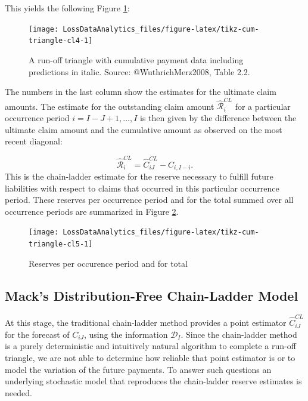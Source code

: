 \documentclass[]{book}
\begin{document}
This yields the following Figure \ref{fig:tikz-cum-triangle-cl4}:

\begin{figure}

{\centering \texttt{[image: LossDataAnalytics\_files/figure-latex/tikz-cum-triangle-cl4-1]} 

}

\caption{A run-off triangle with cumulative payment data including predictions in italic. Source: @WuthrichMerz2008, Table 2.2.}\label{fig:tikz-cum-triangle-cl4}
\end{figure}

The numbers in the last column show the estimates for the ultimate claim
amounts. The estimate for the outstanding claim amount
\(\hat{\mathcal{R}}_i^{CL}\) for a particular occurrence period
\(i=I-J+1,\ldots, I\) is then given by the difference between the
ultimate claim amount and the cumulative amount as observed on the most
recent diagonal:

\[
\hat{\mathcal{R}}_i^{CL} =\hat{C}_{iJ}^{CL}-C_{i,I-i}.
\] This is the chain-ladder estimate for the reserve necessary to
fulfill future liabilities with respect to claims that occurred in this
particular occurrence period. These reserves per occurrence period and
for the total summed over all occurrence periods are summarized in
Figure \ref{fig:tikz-cum-triangle-cl5}.

\begin{figure}

{\centering \texttt{[image: LossDataAnalytics\_files/figure-latex/tikz-cum-triangle-cl5-1]} 

}

\caption{Reserves per occurence period and for total}\label{fig:tikz-cum-triangle-cl5}
\end{figure}

\subsection{Mack's Distribution-Free Chain-Ladder
Model}\label{macks-distribution-free-chain-ladder-model}

At this stage, the traditional chain-ladder method provides a point
estimator \(\hat{C}^{CL}_{iJ}\) for the forecast of \(C_{iJ}\), using
the information \(\mathcal{D}_I\). Since the chain-ladder method is a
purely deterministic and intuitively natural algorithm to complete a
run-off triangle, we are not able to determine how reliable that point
estimator is or to model the variation of the future payments. To answer
such questions an underlying stochastic model that reproduces the
chain-ladder reserve estimates is needed.
\end{document}
